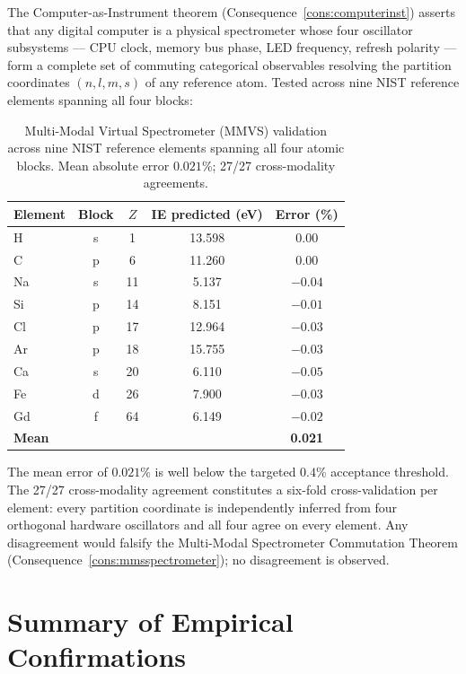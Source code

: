 The Computer-as-Instrument theorem (Consequence~\ref{cons:computerinst})
asserts that any digital computer is a physical spectrometer whose four
oscillator subsystems --- CPU clock, memory bus phase, LED frequency,
refresh polarity --- form a complete set of commuting categorical observables
resolving the partition coordinates $(n,l,m,s)$ of any reference atom.
Tested across nine NIST reference elements spanning all four blocks:

\begin{table}[htbp]
\centering
\caption{Multi-Modal Virtual Spectrometer (MMVS) validation across nine
NIST reference elements spanning all four atomic blocks.
Mean absolute error $0.021$\%; 27/27 cross-modality agreements.}
\label{tab:mmvs}
\begin{tabular}{@{}lcccc@{}}
\toprule
Element & Block & $Z$ & IE predicted (eV) & Error (\%) \\
\midrule
H  & s & 1  & 13.598 & 0.00 \\
C  & p & 6  & 11.260 & 0.00 \\
Na & s & 11 & 5.137  & $-0.04$ \\
Si & p & 14 & 8.151  & $-0.01$ \\
Cl & p & 17 & 12.964 & $-0.03$ \\
Ar & p & 18 & 15.755 & $-0.03$ \\
Ca & s & 20 & 6.110  & $-0.05$ \\
Fe & d & 26 & 7.900  & $-0.03$ \\
Gd & f & 64 & 6.149  & $-0.02$ \\
\midrule
\textbf{Mean} & & & & \textbf{0.021} \\
\bottomrule
\end{tabular}
\end{table}

The mean error of $0.021$\% is well below the targeted $0.4$\% acceptance
threshold.  The 27/27 cross-modality agreement constitutes a six-fold
cross-validation per element: every partition coordinate is independently
inferred from four orthogonal hardware oscillators and all four agree on
every element.  Any disagreement would falsify the Multi-Modal Spectrometer
Commutation Theorem (Consequence~\ref{cons:mmsspectrometer}); no
disagreement is observed.

\section{Summary of Empirical Confirmations}
\label{sec:predictions-summary-table}

